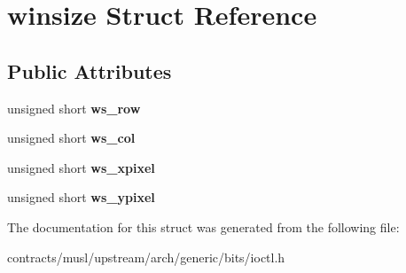 \hypertarget{structwinsize}{}\section{winsize Struct Reference}
\label{structwinsize}
\subsection*{Public Attributes}
\begin{DoxyCompactItemize}
\item 
\mbox{\label{structwinsize_a73698fa1d966374b0701e4bf225f0141}} 
unsigned short {\bfseries ws\+\_\+row}
\item 
\mbox{\label{structwinsize_a80bedf71a49fd324e0d92d0702cc7005}} 
unsigned short {\bfseries ws\+\_\+col}
\item 
\mbox{\label{structwinsize_a98b55f3411b646eca1e13cb52c5795e4}} 
unsigned short {\bfseries ws\+\_\+xpixel}
\item 
\mbox{\label{structwinsize_aca568563970602b60eb32fc17bd5a630}} 
unsigned short {\bfseries ws\+\_\+ypixel}
\end{DoxyCompactItemize}


The documentation for this struct was generated from the following file\+:\begin{DoxyCompactItemize}
\item 
contracts/musl/upstream/arch/generic/bits/ioctl.\+h\end{DoxyCompactItemize}
